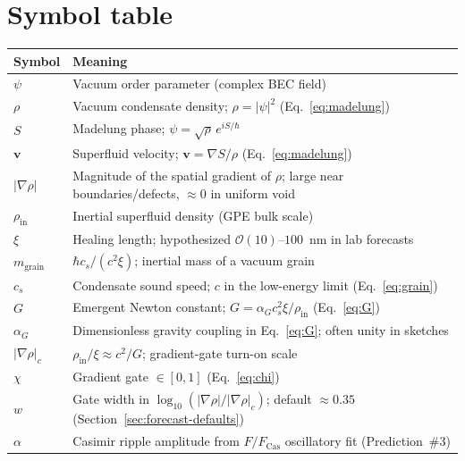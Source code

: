 \documentclass[11pt,a4paper]{article}
\begin{document}
\printbibliography

\appendix

\section{Symbol table}
\label{app:symbols}

\begin{table}[htbp]
  \centering
  \small
  \begin{tabularx}{\linewidth}{@{}l>{\raggedright\arraybackslash}X@{}}
    \toprule
    Symbol & Meaning \\
    \midrule
    $\psi$ & Vacuum order parameter (complex BEC field) \\
    $\rho$ & Vacuum condensate density; $\rho = |\psi|^2$ (Eq.~\ref{eq:madelung}) \\
    $S$ & Madelung phase; $\psi = \sqrt{\rho}\,e^{iS/\hbar}$ \\
    $\mathbf{v}$ & Superfluid velocity; $\mathbf{v} = \nabla S/\rho$ (Eq.~\ref{eq:madelung}) \\
    $|\nabla\rho|$ & Magnitude of the spatial gradient of $\rho$; large near boundaries/defects, $\approx 0$ in uniform void \\
    \midrule
    $\rho_{\mathrm{in}}$ & Inertial superfluid density (GPE bulk scale) \\
    $\xi$ & Healing length; hypothesized $\mathcal{O}(10)$--$100$~nm in lab forecasts \\
    $m_{\mathrm{grain}}$ & $\hbar c_s/(c^2\xi)$; inertial mass of a vacuum grain \\
    $c_s$ & Condensate sound speed; $c$ in the low-energy limit (Eq.~\ref{eq:grain}) \\
    $G$ & Emergent Newton constant; $G = \alpha_G c_s^2 \xi / \rho_{\mathrm{in}}$ (Eq.~\ref{eq:G}) \\
    $\alpha_G$ & Dimensionless gravity coupling in Eq.~\ref{eq:G}; often unity in sketches \\
    \midrule
    $|\nabla\rho|_c$ & $\rho_{\mathrm{in}}/\xi \approx c^2/G$; gradient-gate turn-on scale \\
    $\chi$ & Gradient gate $\in [0,1]$ (Eq.~\ref{eq:chi}) \\
    $w$ & Gate width in $\log_{10}(|\nabla\rho|/|\nabla\rho|_c)$; default $\approx 0.35$ (Section~\ref{sec:forecast-defaults}) \\
    \midrule
    $\alpha$ & Casimir ripple amplitude from $F/F_{\mathrm{Cas}}$ oscillatory fit (Prediction~\#3) \\

\end{tabularx}
\end{table}
\end{document}
